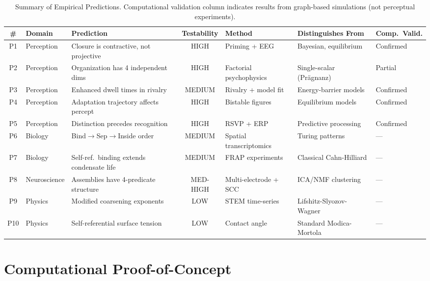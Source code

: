 \documentclass[lettersize,journal]{IEEEtran}
\begin{document}
\begin{table}[!t]
\centering
\caption{Summary of Empirical Predictions. Computational validation column indicates results from graph-based simulations (not perceptual experiments).}
\label{tab:predictions}
\begin{tabular}{clp{2.6cm}cp{2.2cm}p{2.5cm}p{1.8cm}}
\toprule
\textbf{\#} & \textbf{Domain} & \textbf{Prediction} & \textbf{Testability} & \textbf{Method} & \textbf{Distinguishes From} & \textbf{Comp.\ Valid.} \\
\midrule
P1 & Perception & Closure is contractive, not projective & HIGH & Priming + EEG & Bayesian, equilibrium & Confirmed \\
P2 & Perception & Organization has 4 independent dims & HIGH & Factorial psychophysics & Single-scalar (Pr\"{a}gnanz) & Partial \\
P3 & Perception & Enhanced dwell times in rivalry & MEDIUM & Rivalry + model fit & Energy-barrier models & Confirmed \\
P4 & Perception & Adaptation trajectory affects percept & HIGH & Bistable figures & Equilibrium models & Confirmed \\
P5 & Perception & Distinction precedes recognition & HIGH & RSVP + ERP & Predictive processing & Confirmed \\
\addlinespace
P6 & Biology & Bind$\to$Sep$\to$Inside order & MEDIUM & Spatial transcriptomics & Turing patterns & --- \\
P7 & Biology & Self-ref.\ binding extends condensate life & MEDIUM & FRAP experiments & Classical Cahn-Hilliard & --- \\
P8 & Neuroscience & Assemblies have 4-predicate structure & MED-HIGH & Multi-electrode + SCC & ICA/NMF clustering & --- \\
\addlinespace
P9 & Physics & Modified coarsening exponents & LOW & STEM time-series & Lifshitz-Slyozov-Wagner & --- \\
P10 & Physics & Self-referential surface tension & LOW & Contact angle & Standard Modica-Mortola & --- \\
\bottomrule
\end{tabular}
\end{table}


\section{Computational Proof-of-Concept}
\end{document}
